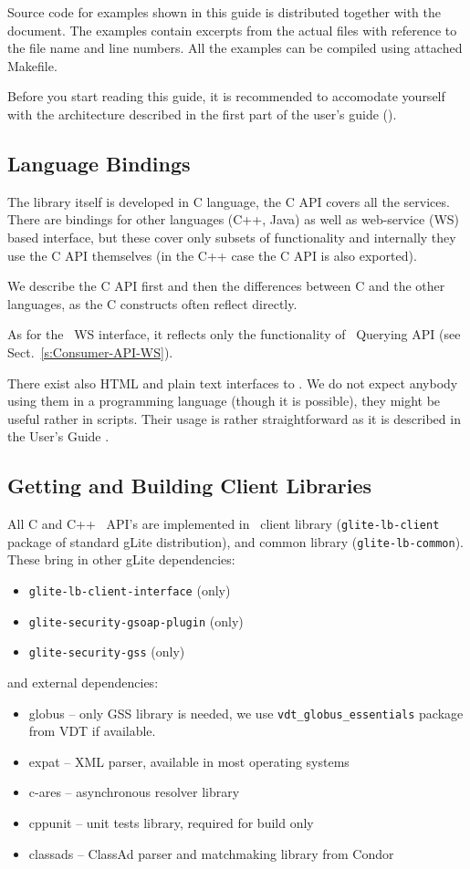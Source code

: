 %
Source code for examples shown in this guide is distributed together
with the document. The examples contain excerpts from the actual files
with reference to the file name and line numbers. All the examples can
be compiled using attached Makefile.

%
Before you start reading this guide, it is recommended to accomodate
yourself with the \LB architecture described in the first part of the
\LB user's guide (\cite{lbug}).


\subsection{Language Bindings}
The \LB library itself is developed in C language, the C API covers
all the \LB services. There are bindings for other languages (C++,
Java) as well as web-service (WS) based interface, but these cover only
subsets of \LB functionality and internally they use the C API
themselves (in the C++ case the C API is also exported).

We describe the C API first and then the differences between C and the
other languages, as the C constructs often reflect directly.

As for the \LB\ WS interface, it reflects only the functionality of 
\LB\ Querying API (see Sect.~\ref{s:Consumer-API-WS}). 

There exist also HTML and plain text interfaces to \LB. We do not expect anybody using them 
in a programming language (though it is possible), they might be useful rather in
scripts. Their usage is rather straightforward as it is described in the User's Guide \cite{lbug}.


\subsection{Getting and Building Client Libraries}

All C and C++ \LB\ API's  are implemented in \LB\ client library
(\verb'glite-lb-client' package of standard gLite distribution),
and \LB common library (\verb'glite-lb-common'). 
These bring in other gLite dependencies:
\begin{itemize}
\item \verb'glite-lb-client-interface' (\LBold only)
\item \verb'glite-security-gsoap-plugin' (\LBold only)
\item \verb'glite-security-gss' (\LBnew only)
\end{itemize}
and external dependencies:
\begin{itemize}
\item globus -- only GSS library is needed, we use 
\verb'vdt_globus_essentials' package from VDT if available.
\item expat -- XML parser, available in most operating systems
\item c-ares -- asynchronous resolver library
\item cppunit -- unit tests library, required for build only
\item classads -- ClassAd parser and matchmaking library from Condor
\end{itemize}

